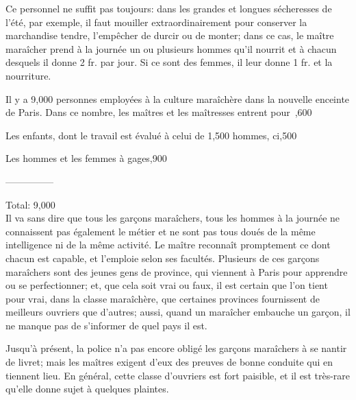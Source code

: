 \documentclass[10pt,a4paper]{book}
\begin{document}
Ce personnel ne suffit pas toujours: dans les grandes et longues sécheresses de l'été, par exemple, il faut mouiller extraordinairement pour conserver la marchandise tendre, l'empêcher de durcir ou de monter; dans ce cas, le maître maraîcher prend à la journée un ou plusieurs hommes qu'il nourrit et à chacun desquels il donne 2 fr. par jour. Si ce sont des femmes, il leur donne 1 fr. et la nourriture.

Il y a 9,000 personnes employées à la culture maraîchère dans la nouvelle enceinte de Paris. Dans ce nombre, les maîtres et les maîtresses entrent pour~,600

Les enfants, dont le travail est évalué à celui de 1,500 hommes, ci,500

Les hommes et les femmes à gages,900

\hfill ---------------

\hfill Total: 9,000\\

Il va sans dire que tous les garçons maraîchers, tous les hommes à la journée ne connaissent pas également le métier et ne sont pas tous doués de la même intelligence ni de la même activité. Le maître reconnaît promptement ce dont chacun est capable, et l'emploie selon ses facultés. Plusieurs de ces garçons maraîchers sont des jeunes gens de province, qui viennent à Paris pour apprendre ou se perfectionner; et, que cela soit vrai ou faux, il est certain que l'on tient pour vrai, dans la classe maraîchère, que certaines provinces fournissent de meilleurs ouvriers que d'autres; aussi, quand un maraîcher embauche un garçon, il ne manque pas de s'informer de quel pays il est.

Jusqu'à présent, la police n'a pas encore obligé les garçons maraîchers à se nantir de livret; mais les maîtres exigent d'eux des preuves de bonne conduite qui en tiennent lieu. En général, cette classe d'ouvriers est fort paisible, et il est très-rare qu'elle donne sujet à quelques plaintes.
\end{document}
